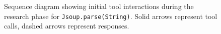 \begin{figure}[thb]
\centering

\caption{Sequence diagram showing initial tool interactions during the research phase for \texttt{Jsoup.parse(String)}. Solid arrows represent tool calls, dashed arrows represent responses.}
\label{fig:research-sequence}
\end{figure}
